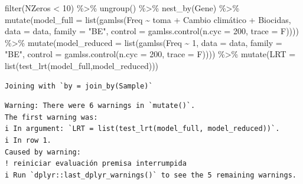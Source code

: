 \documentclass[
  letterpaper,
  DIV=11,
  numbers=noendperiod]{scrartcl}
\newenvironment{Shaded}{\begin{snugshade}}{\end{snugshade}}
\newcommand{\AttributeTok}[1]{\textcolor[rgb]{0.40,0.45,0.13}{#1}}
\newcommand{\DecValTok}[1]{\textcolor[rgb]{0.68,0.00,0.00}{#1}}
\newcommand{\FunctionTok}[1]{\textcolor[rgb]{0.28,0.35,0.67}{#1}}
\newcommand{\NormalTok}[1]{\textcolor[rgb]{0.00,0.23,0.31}{#1}}
\newcommand{\SpecialCharTok}[1]{\textcolor[rgb]{0.37,0.37,0.37}{#1}}
\newcommand{\StringTok}[1]{\textcolor[rgb]{0.13,0.47,0.30}{#1}}
\begin{document}
\begin{Shaded}
\begin{Highlighting}[]
  \FunctionTok{filter}\NormalTok{(NZeros }\SpecialCharTok{\textless{}} \DecValTok{10}\NormalTok{) }\SpecialCharTok{\%\textgreater{}\%} 
  \FunctionTok{ungroup}\NormalTok{() }\SpecialCharTok{\%\textgreater{}\%} 
  \FunctionTok{nest\_by}\NormalTok{(Gene) }\SpecialCharTok{\%\textgreater{}\%} 
  \FunctionTok{mutate}\NormalTok{(}\AttributeTok{model\_full =} \FunctionTok{list}\NormalTok{(}\FunctionTok{gamlss}\NormalTok{(Freq }\SpecialCharTok{\textasciitilde{}}\NormalTok{ toma }\SpecialCharTok{+} \StringTok{\textasciigrave{}}\AttributeTok{Cambio climático}\StringTok{\textasciigrave{}} \SpecialCharTok{+}\NormalTok{ Biocidas, }
                             \AttributeTok{data =}\NormalTok{ data,}
                             \AttributeTok{family =} \StringTok{"BE"}\NormalTok{, }
                             \AttributeTok{control =} \FunctionTok{gamlss.control}\NormalTok{(}\AttributeTok{n.cyc =} \DecValTok{200}\NormalTok{, }\AttributeTok{trace =}\NormalTok{ F)))) }\SpecialCharTok{\%\textgreater{}\%} 
  \FunctionTok{mutate}\NormalTok{(}\AttributeTok{model\_reduced =} \FunctionTok{list}\NormalTok{(}\FunctionTok{gamlss}\NormalTok{(Freq }\SpecialCharTok{\textasciitilde{}} \DecValTok{1}\NormalTok{, }
                             \AttributeTok{data =}\NormalTok{ data,}
                             \AttributeTok{family =} \StringTok{"BE"}\NormalTok{, }
                             \AttributeTok{control =} \FunctionTok{gamlss.control}\NormalTok{(}\AttributeTok{n.cyc =} \DecValTok{200}\NormalTok{, }\AttributeTok{trace =}\NormalTok{ F)))) }\SpecialCharTok{\%\textgreater{}\%}
  \FunctionTok{mutate}\NormalTok{(}\AttributeTok{LRT =} \FunctionTok{list}\NormalTok{(}\FunctionTok{test\_lrt}\NormalTok{(model\_full,model\_reduced)))}
\end{Highlighting}
\end{Shaded}

\begin{verbatim}
Joining with `by = join_by(Sample)`
\end{verbatim}

\begin{verbatim}
Warning: There were 6 warnings in `mutate()`.
The first warning was:
i In argument: `LRT = list(test_lrt(model_full, model_reduced))`.
i In row 1.
Caused by warning:
! reiniciar evaluación premisa interrumpida
i Run `dplyr::last_dplyr_warnings()` to see the 5 remaining warnings.
\end{verbatim}
\end{document}
